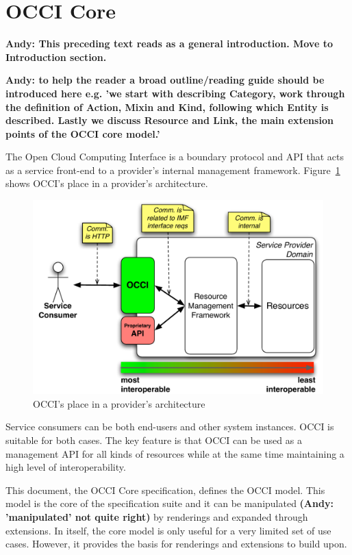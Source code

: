 \documentclass[10pt,a4paper]{article}
\begin{document}
\section{OCCI Core}
\textbf{Andy: This preceding text reads as a general introduction. Move to Introduction section.}

\textbf{Andy: to help the reader a broad outline/reading guide should be introduced here
e.g. 'we start with describing Category, work through the definition of Action, Mixin and Kind,
following which Entity is described. Lastly we discuss Resource and Link, the main extension
points of the OCCI core model.'}

The Open Cloud Computing Interface is a boundary protocol and API
that acts as a service front-end to a provider's internal management
framework. Figure~\ref{fig:placement} shows OCCI's place in a
provider's architecture.
\begin{figure}[h]
	\centering
	\includegraphics[scale=0.5]{figs/occi-intro.pdf}
	\caption{OCCI's place in a provider's architecture}
	\label{fig:placement}
\end{figure}
Service consumers can be both end-users and other system instances. OCCI is
suitable for both cases. The key feature is that OCCI can be used as a
management API for all kinds of resources while at the same time maintaining a
high level of interoperability.

This document, the OCCI Core specification, defines the OCCI model. This
model is the core of the specification suite and it can be manipulated 
\textbf{(Andy: 'manipulated' not quite right)} by renderings and expanded 
through extensions. In itself, the core model is only useful
for a very limited set of use cases. However, it provides the basis for
renderings and extensions to build upon.
\end{document}
